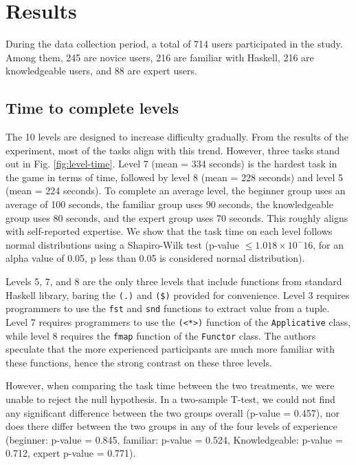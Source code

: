 \documentclass[preprint,12pt]{elsarticle}
\begin{document}
\section{Results}

During the data collection period, a total of 714 users participated in the study. Among them, 245 are novice users, 216 are familiar with Haskell, 216 are knowledgeable users, and 88 are expert users. 

\subsection{Time to complete levels}

The 10 levels are designed to increase difficulty gradually. From the results of the experiment, most of the tasks align with this trend. However, three tasks stand out in Fig. \ref{fig:level-time}.  Level 7 (mean = 334 seconds) is the hardest task in the game in terms of time, followed by level 8 (mean = 228 seconds) and level 5 (mean = 224 seconds). To complete an average level, the beginner group uses an average of 100 seconds, the familiar group uses 90 seconds, the knowledgeable group uses 80 seconds, and the expert group uses 70 seconds. This roughly aligns with self-reported expertise. We show that the task time on each level follows normal distributions using a Shapiro-Wilk test \cite{Shaphiro1965-dx} (p-value  $ \leq 1.018 \times 10^-16$, for an alpha value of 0.05, p less than 0.05 is considered normal distribution).

Levels 5, 7, and 8 are the only three levels that include functions from standard Haskell library, baring the \texttt{(.)} and \texttt{(\$)} provided for convenience. Level 3 requires programmers to use the \texttt{fst} and \texttt{snd} functions to extract value from a tuple. Level 7 requires programmers to use the \texttt{(<*>)} function of the \texttt{Applicative} class, while level 8 requires the \texttt{fmap} function of the \texttt{Functor} class. The authors speculate that the more experienced participants are much more familiar with these functions, hence the strong contrast on these three levels. 

However, when comparing the task time between the two treatments, we were unable to reject the null hypothesis. In a two-sample T-test, we could not find any significant difference between the two groups overall (p-value = 0.457), nor does there differ between the two groups in any of the four levels of experience (beginner: p-value = 0.845, familiar: p-value = 0.524, Knowledgeable: p-value = 0.712, expert p-value = 0.771).
\end{document}
